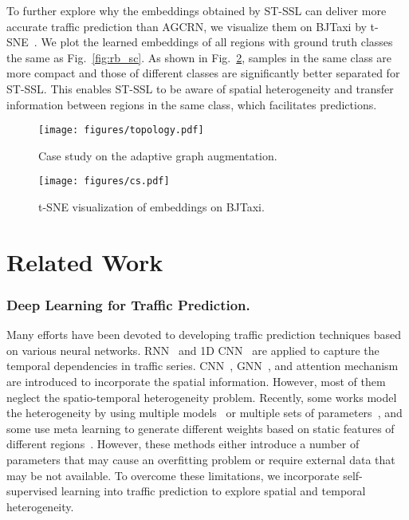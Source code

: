 \documentclass[letterpaper]{article} \usepackage{aaai23}  \usepackage{times}  \usepackage{helvet}  \usepackage{courier}  \usepackage[hyphens]{url}  \usepackage{graphicx} \urlstyle{rm} \def\UrlFont{\rm}  \usepackage{natbib}  \usepackage{caption} \frenchspacing  \setlength{\pdfpagewidth}{8.5in} \setlength{\pdfpageheight}{11in}
\newcommand{\name}{ST-SSL\xspace}
\newcommand{\figureautorefname}{Fig.}
\begin{document}
To further explore why the embeddings obtained by \name can deliver more accurate traffic prediction than AGCRN, we visualize them on BJTaxi by t-SNE~\cite{van2008visualizing}. We plot the learned embeddings of all regions with ground truth classes the same as \figureautorefname{~\ref{fig:rb_sc}}. As shown in \figureautorefname{~\ref{fig:cs}}, samples in the same class are more compact and those of different classes are significantly better separated for \name. This enables \name to be aware of spatial heterogeneity and transfer information between regions in the same class, which facilitates predictions.


\begin{figure}[t]
\centering
\texttt{[image: figures/topology.pdf]}
\caption{Case study on the adaptive graph augmentation.}
\vspace{-.3cm}
\label{fig:cs_adaaug}
\end{figure}

\begin{figure}[t]
\centering
\texttt{[image: figures/cs.pdf]}
\caption{t-SNE visualization of embeddings on BJTaxi.}
\vspace{-.3cm}
\label{fig:cs}
\end{figure}

\section{Related Work}\label{sec:related}

\subsubsection{Deep Learning for Traffic Prediction.} Many efforts have been devoted to developing traffic prediction techniques based on various neural networks. RNN~\cite{wang2019empowering, ji2020interpretable} and 1D CNN~\cite{wang2022traffic,wang2016traffic} are applied to capture the temporal dependencies in traffic series. CNN~\cite{zhang2017deep,yao2019revisiting}, GNN~\cite{zhang2020spatial,ji2022stden}, and attention mechanism~\cite{zheng2020gman} are introduced to incorporate the spatial information. However, most of them neglect the spatio-temporal heterogeneity problem. Recently, some works model the heterogeneity by using multiple models~\cite{yuan2018hetero} or multiple sets of parameters~\cite{bai2020adaptive,li2021spatial}, and some use meta learning to generate different weights based on static features of different regions~\cite{pan2019urban,ye2022meta}. However, these methods either introduce a number of parameters that may cause an overfitting problem or require external data that may be not available. To overcome these limitations, we incorporate self-supervised learning into traffic prediction to explore spatial and temporal heterogeneity.
\end{document}
